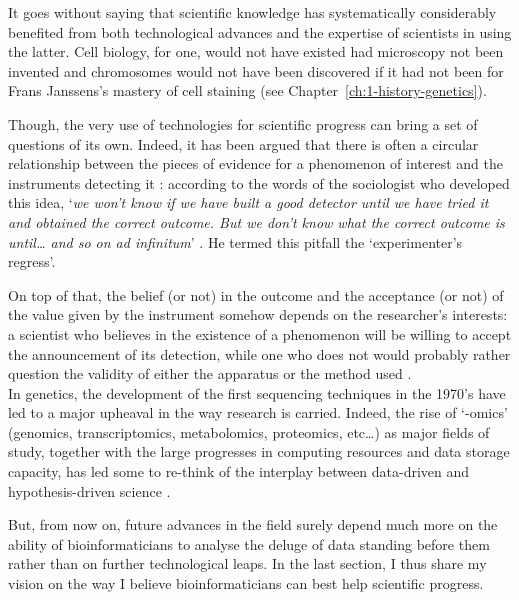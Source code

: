 It goes without saying that scientific knowledge has systematically considerably benefited from both technological advances and the expertise of scientists in using the latter.
Cell biology, for one, would not have existed had microscopy not been invented \citep{bechtel2006discovering} and chromosomes would not have been discovered if it had not been for Frans Janssens's mastery of cell staining (see Chapter~\ref{ch:1-history-genetics}).

Though, the very use of technologies for scientific progress can bring a set of questions of its own.
Indeed, it has been argued that there is often a circular relationship between the pieces of evidence for a phenomenon of interest and the instruments detecting it \citep[reviewed in \citealp{godin2002experimenters}]{collins1975seven,collins1985changing}: 
according to the words of the sociologist who developed this idea, ‘\textit{we won't know if we have built a good detector until we have tried it and obtained the correct outcome. But we don't know what the correct outcome is until… and so on ad infinitum}’ \citep{collins1985changing}.
He termed this pitfall the ‘experimenter's regress’.

On top of that, the belief (or not) in the outcome and the acceptance (or not) of the value given by the instrument somehow depends on the researcher's interests: a scientist who believes in the existence of a phenomenon will be willing to accept the announcement of its detection, while one who does not would probably rather question the validity of either the apparatus or the method used \citep{gingras2017determinants}.\\


In genetics, the development of the first sequencing techniques in the 1970's have led to a major upheaval in the way research is carried.
Indeed, the rise of ‘-omics’ (genomics, transcriptomics, metabolomics, proteomics, etc…) as major fields of study, together with the large progresses in computing resources and data storage capacity, has led some to re-think of the interplay between data-driven and hypothesis-driven science \citep{kell2004here, mazzocchi2015could}.

But, from now on, future advances in the field surely depend much more on the ability of bioinformaticians to analyse the deluge of data standing before them rather than on further technological leaps.
In the last section, I thus share my vision on the way I believe bioinformaticians can best help scientific progress.


